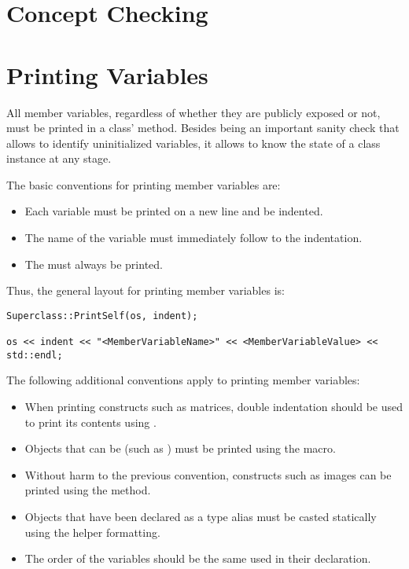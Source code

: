 \section{Concept Checking}
\label{sec:ConceptChecking}


\section{Printing Variables}
\label{sec:PrintingVariables}

All member variables, regardless of whether they are publicly exposed or not,
must be printed in a class'  method. Besides being an
important sanity check that allows to identify uninitialized variables, it
allows to know the state of a class instance at any stage.

The basic conventions for printing member variables are:
\begin{itemize}
\item Each variable must be printed on a new line and be indented.
\item The name of the variable must immediately follow to the indentation.
\item The  must always be printed.
\end{itemize}

Thus, the general layout for printing member variables is:

\small
\begin{verbatim}
Superclass::PrintSelf(os, indent);

os << indent << "<MemberVariableName>" << <MemberVariableValue> << std::endl;
\end{verbatim}
\normalsize

The following additional conventions apply to printing member variables:
\begin{itemize}
\item When printing constructs such as matrices, double indentation should be
used to print its contents using .
\item Objects that can be  (such as ) must be
printed using the  macro.
\item Without harm to the previous convention, constructs such as images can
be printed using the  method.
\item Objects that have been declared as a type alias must be casted
statically using the  helper
formatting.
\item The order of the variables should be the same used in their declaration.
\end{itemize}

